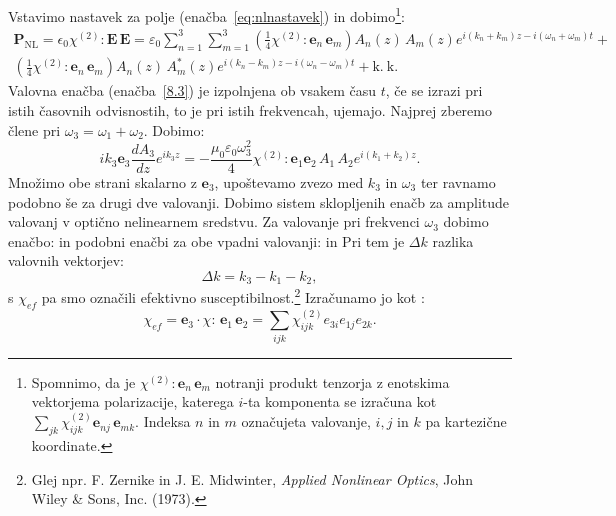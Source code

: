 Vstavimo nastavek za polje (enačba~\ref{eq:nlnastavek}) 
in dobimo\footnote{Spomnimo, da je $\chi^{(2)}:\mathbf{e}_{n}\,\mathbf{e}_{m}$ 
notranji produkt tenzorja z enotskima vektorjema polarizacije, 
katerega $i$-ta komponenta se izračuna kot $\sum_{jk}\chi^{(2)}_{ijk}\mathbf{e}_{nj}\,\mathbf{e}_{mk}$.
Indeksa $n$ in $m$ označujeta valovanje, $i, j$ in $k$ pa kartezične koordinate.}:
\begin{multline}
\mathbf{P}_{\mathrm{NL}}= \epsilon_{0}\chi^{(2)}:\mathbf{E}\, \mathbf{E} =
\varepsilon_0 \sum_{n=1}^3 \sum_{m=1}^3 
 \left( \frac{1}{4} \chi^{(2)}:\mathbf{e}_{n}\,\mathbf{e}_{m}\right) 
 A_{n}(z)\,A_{m}(z) e^{i(k_{n}+k_{m})z-i(\omega_{n}+\omega_{m})t}+  \\
\left( \frac{1}{4} \chi^{(2)}:\mathbf{e}_{n}\,\mathbf{e}_{m}\right)
A_{n}(z)\,A_{m}^*(z) e^{i(k_{n}-k_{m})z-i(\omega_{n}-\omega_{m})t}+ \mathrm{k.~k.}
\label{8.5b}
\end{multline}
Valovna enačba (enačba~\ref{8.3}) je izpolnjena ob vsakem času $t$, če se izrazi 
pri istih časovnih odvisnostih, to je pri istih frekvencah, ujemajo. Najprej 
zberemo člene pri $\omega_3 = \omega_1 + \omega_2$. Dobimo:
\begin{equation}
ik_{3}\mathbf{e}_{3}\frac{dA_{3}}{dz}e^{ik_{3}z}=-\frac{\mu_{0} 
\varepsilon_0 \omega_{3}^{2}}{4}\chi^{(2)}:\mathbf{e}_{1}\mathbf{e}_{2}\,A_{1}\,A_{2}e^{i(k_{1}+k_{2})z}.
\label{8.7}
\end{equation}
Množimo obe strani skalarno z $\mathbf{e}_{3}$, upoštevamo zvezo med $k_{3}$ in $\omega_{3}$
ter ravnamo podobno še za drugi dve valovanji. Dobimo sistem sklopljenih
enačb za amplitude valovanj v optično nelinearnem sredstvu. Za valovanje pri frekvenci $\omega_3$
dobimo enačbo:
in podobni enačbi za obe vpadni valovanji:
in 
Pri tem je $\Delta k$ razlika valovnih vektorjev:
\begin{equation}
\Delta k = k_{3}-k_{1}-k_{2},
\end{equation}
s $\chi_{ef}$ pa smo označili efektivno susceptibilnost.\footnote{Glej npr. F. Zernike in J. E. Midwinter, 
{\it Applied Nonlinear Optics}, John Wiley \& Sons, Inc. (1973).}
Izračunamo jo kot :
\begin{equation}
\chi_{ef}=\mathbf{e}_{3}\cdot\chi:\,\mathbf{e}_{1}\,\mathbf{e}_{2} = 
\sum_{ijk} \chi_{ijk}^{(2)} e_{3i} e_{1j} e_{2k}.
\label{eq:chicomp}
\end{equation}
